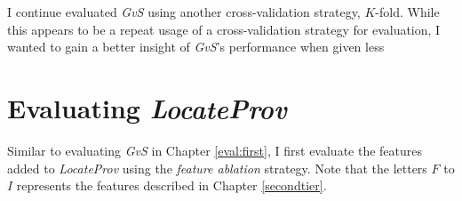 I continue evaluated {\it GvS} using another cross-validation strategy, $K$-fold. While this appears to be a repeat usage of a cross-validation strategy for evaluation, I wanted to gain a better insight of {\it GvS}'s performance when given less 


\section{Evaluating {\it LocateProv}}
\label{eval:second}
Similar to evaluating {\it GvS} in Chapter \ref{eval:first}, I first evaluate the features added to {\it LocateProv} using the {\it feature ablation} strategy. Note that the letters $F$ to $I$ represents the features described in Chapter \ref{secondtier}.


